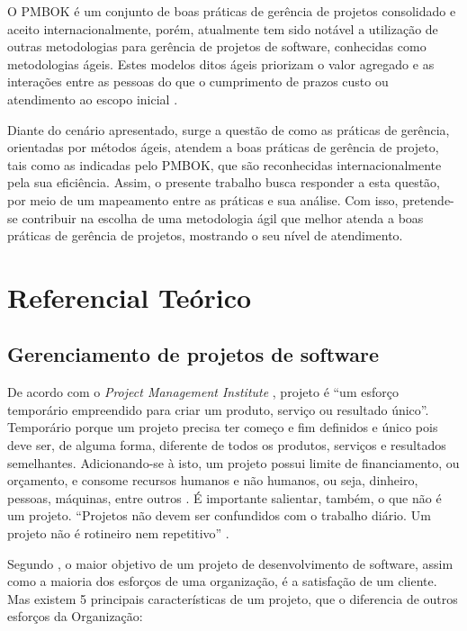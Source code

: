 \documentclass[
    12pt,               %
    openright,          %
    twoside,            %
    a4paper,            %
    chapter=TITLE,     %
    english,            %
    spanish,            %
    portuguese              %
    ]{abntex2}
\newcommand\dblquote[1]{\textquotedblleft #1\textquotedblright}
\begin{document}
O PMBOK é um conjunto de boas práticas de gerência de projetos consolidado e aceito internacionalmente, porém, atualmente tem sido notável a utilização de outras metodologias para gerência de projetos de software, conhecidas como metodologias ágeis. Estes modelos ditos ágeis priorizam o valor agregado e as interações entre as pessoas do que o cumprimento de prazos custo ou atendimento ao escopo inicial \cite[p.~xxi]{prikladnickiAtAll}.

Diante do cenário apresentado, surge a questão de como as práticas de gerência, orientadas por métodos ágeis, atendem a boas práticas de gerência de projeto, tais como as indicadas pelo PMBOK, que são reconhecidas internacionalmente pela sua eficiência. Assim, o presente trabalho busca responder a esta questão, por meio de um mapeamento  entre as práticas e sua análise. Com isso, pretende-se contribuir na escolha de uma metodologia ágil que melhor atenda a boas práticas de gerência de projetos, mostrando o seu nível de atendimento.


\chapter{Referencial Teórico}

\section{Gerenciamento de projetos de software}

De acordo com o \textit{Project Management Institute} \cite{pmi2013}, projeto é \dblquote{um esforço temporário empreendido para criar um produto, serviço ou resultado único}. Temporário porque um projeto precisa ter começo e fim definidos e único pois deve ser, de alguma forma, diferente de todos os produtos, serviços e resultados semelhantes. Adicionando-se à isto, um projeto possui limite de financiamento, ou orçamento, e consome recursos humanos e não humanos, ou seja, dinheiro, pessoas, máquinas, entre outros \cite[p.~2]{kerzner2011}. É importante salientar, também, o que não é um projeto. \dblquote{Projetos não devem ser confundidos com o trabalho diário. Um projeto não é rotineiro nem repetitivo} \cite[p.~6]{grayLarson2009}.

Segundo , o maior objetivo de um projeto de desenvolvimento de software, assim como a maioria dos esforços de uma organização, é a satisfação de um cliente. Mas existem 5 principais características de um projeto, que o diferencia de outros esforços da Organização: 
\end{document}

